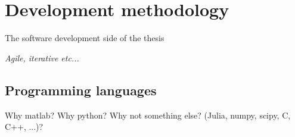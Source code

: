 \section{Development methodology}

The software development side of the thesis

\textit{Agile, iterative etc...}

\subsection{Programming languages}

Why matlab? Why python? Why not something else? (Julia, numpy, scipy, C, C++, ...)?

